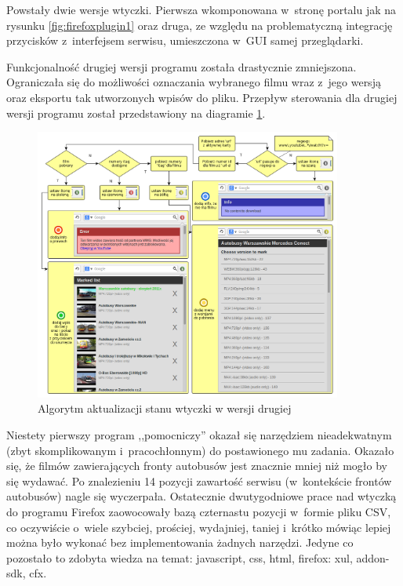 Powstały dwie wersje wtyczki. Pierwsza wkomponowana w~stronę portalu
jak na rysunku \ref{fig:firefoxplugin1} oraz druga, 
ze względu na problematyczną integrację przycisków z~interfejsem serwisu,
umieszczona w~GUI samej przeglądarki.

Funkcjonalność drugiej wersji programu została drastycznie zmniejszona.
Ograniczała się do możliwości oznaczania wybranego filmu 
wraz z~jego wersją oraz
eksportu tak utworzonych wpisów do pliku.
Przepływ sterowania dla drugiej wersji programu został przedstawiony
na diagramie \ref{fig:firefoxpluginflow}.

\begin{figure}[h!]
    \centering
    \includegraphics[width=0.9\textwidth]{img/env_yt_marker}
    \caption{Algorytm aktualizacji stanu wtyczki w wersji drugiej}
    \label{fig:firefoxpluginflow}
\end{figure}

Niestety pierwszy program ,,pomocniczy'' okazał się narzędziem nieadekwatnym
(zbyt skomplikowanym i~pracochłonnym) do postawionego mu zadania. 
Okazało się, że
filmów zawierających fronty autobusów jest znacznie mniej niż mogło 
by się wydawać. Po znalezieniu 14 pozycji zawartość serwisu 
(w~kontekście frontów autobusów) nagle się
wyczerpała. Ostatecznie dwutygodniowe prace nad 
wtyczką do programu 
Firefox zaowocowały bazą czternastu pozycji w~formie pliku CSV,
co oczywiście o~wiele szybciej, prościej, wydajniej, taniej i~krótko 
mówiąc lepiej można
było wykonać bez implementowania żadnych narzędzi. 
Jedyne co pozostało to zdobyta wiedza
na temat: javascript, css, html, firefox: xul, addon-sdk, cfx. 

